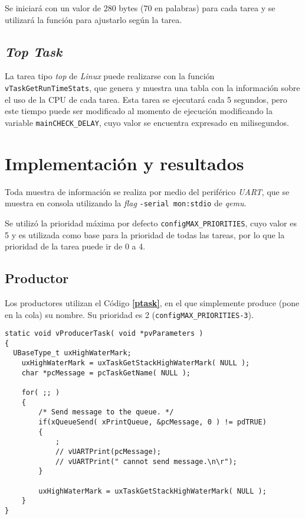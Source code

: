\documentclass[12pt,a4paper]{article}
\begin{document}
Se iniciará con un valor de 280 bytes (70 en palabras) para cada tarea y se
utilizará la función para ajustarlo según la tarea.

\subsection{\emph{Top Task}}
\label{toptask}
La tarea tipo \emph{top} de \emph{Linux} puede realizarse con la función
\verb|vTaskGetRunTimeStats|, que genera y muestra una tabla con la información
sobre el uso de la CPU de cada tarea. Esta tarea se ejecutará cada 5 segundos,
pero este tiempo puede ser modificado al momento de ejecución modificando la
variable \verb|mainCHECK_DELAY|, cuyo valor se encuentra expresado en
milisegundos.


\section{Implementación y resultados}
\label{impres}
Toda muestra de información se realiza por medio del periférico \emph{UART},
que se muestra en consola utilizando la \emph{flag} \verb|-serial mon:stdio| de
\emph{qemu}.

Se utilizó la prioridad máxima por defecto \verb|configMAX_PRIORITIES|, cuyo
valor es 5 y es utilizada como base para la prioridad de todas las tareas, por lo
que la prioridad de la tarea puede ir de 0 a 4.

\subsection{Productor}
\label{prodtask}
Los productores utilizan el Código \textbf{\ref{ptask}}, en el que simplemente
produce (pone en la cola) su nombre. Su prioridad es 2
(\verb|configMAX_PRIORITIES-3|).

\begin{lstlisting}[caption={Función `\emph{vProducerTask}'.}, label={ptask}, language=Ce]
static void vProducerTask( void *pvParameters )
{
  UBaseType_t uxHighWaterMark;
	uxHighWaterMark = uxTaskGetStackHighWaterMark( NULL );
	char *pcMessage = pcTaskGetName( NULL );

	for( ;; )
	{
		/* Send message to the queue. */
		if(xQueueSend( xPrintQueue, &pcMessage, 0 ) != pdTRUE)
		{
			;
			// vUARTPrint(pcMessage);
			// vUARTPrint(" cannot send message.\n\r");
		}

		uxHighWaterMark = uxTaskGetStackHighWaterMark( NULL );
	}
}
\end{lstlisting}
\end{document}
